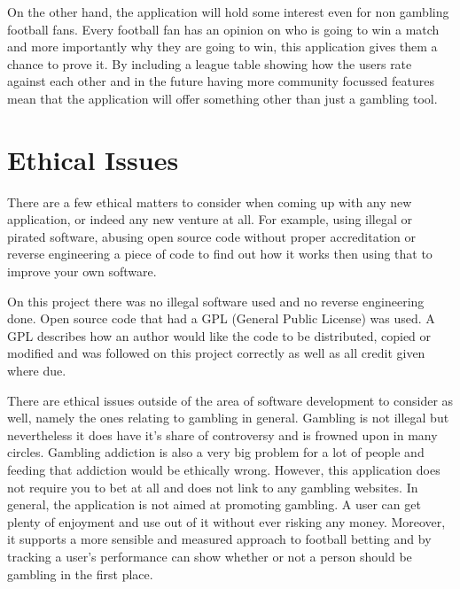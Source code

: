 On the other hand,  the application will hold some interest even for non gambling football fans. Every football fan has an opinion on who is going to win a match and more importantly why they are going to win, this application gives them a chance to prove it. By including a league table showing how the users rate against each other and in the future having more community focussed features mean that the application will offer something other than just a gambling tool.

\section{Ethical Issues}
\label{sec:ethicalissues_lesp}
There are a few ethical matters to consider when coming up with any new application, or indeed any new venture at all. For example, using illegal or pirated software, abusing open source code without proper accreditation or reverse engineering a piece of code to find out how it works then using that to improve your own software.  

On this project there was no illegal software used and no reverse engineering done. Open source code that had a GPL (General Public License) was used. A GPL describes how an author would like the code to be distributed, copied or modified and was followed on this project correctly as well as all credit given where due.  

There are ethical issues outside of the area of software development to consider as well, namely the ones relating to gambling in general. Gambling is not illegal but nevertheless it does have it’s share of controversy and is frowned upon in many circles. Gambling addiction is also a very big problem for a lot of people and feeding that addiction would be ethically wrong. However, this application does not require you to bet at all and does not link to any gambling websites. In general, the application is not aimed at promoting gambling. A user can get plenty of enjoyment and use out of it without ever risking any money.  Moreover, it supports a more sensible and measured approach to football betting and by tracking a user’s performance can show whether or not a person should be gambling in the first place.